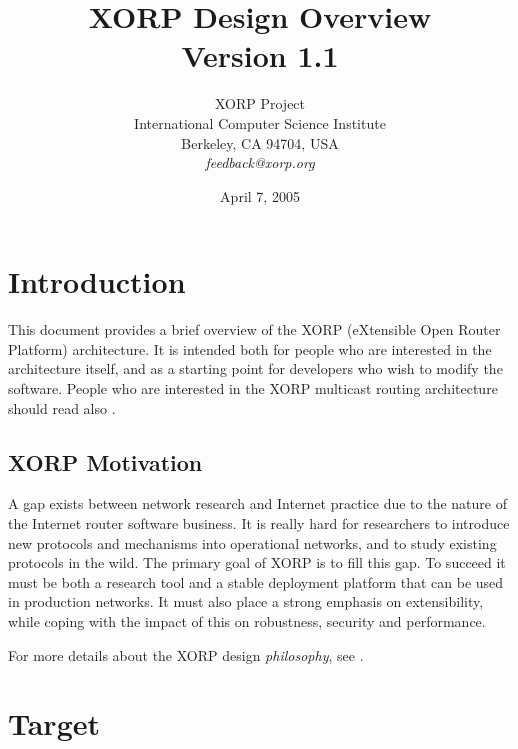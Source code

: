\documentclass[11pt]{article}
\begin{document}
\title{XORP Design Overview \\
\vspace{1ex}
Version 1.1}
\author{ XORP Project					\\
	 International Computer Science Institute	\\
	 Berkeley, CA 94704, USA			\\
	 {\it feedback@xorp.org}
}
\date{April 7, 2005}

\maketitle

\thispagestyle{empty}


\section{Introduction}

This document provides a brief overview of the XORP (eXtensible Open
Router Platform) architecture. It is intended both for people who are
interested in the architecture itself, and as a starting point for developers
who wish to modify the software.  People who are interested in the XORP
multicast routing architecture should read also
\cite{xorp:multicast_arch}.

\subsection{XORP Motivation}

A gap exists between network research and Internet practice due to the
nature of the Internet router software business.  It is really hard
for researchers to introduce new protocols and mechanisms into
operational networks, and to study existing protocols in the wild.
The primary goal of XORP is to fill this gap.  To succeed it must be both
a research tool and a stable deployment platform that can be used in
production networks.  It must also place a strong emphasis on
extensibility, while coping with the impact of this on robustness,
security and performance.

For more details about the XORP design {\it philosophy}, see
\cite{handley:hotnets2002:xorp}.

\section{Target}
\end{document}
